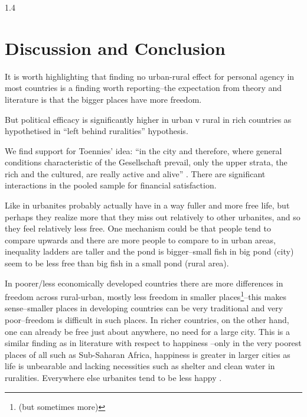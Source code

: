 \documentclass[10pt, letterpaper]{article}
\begin{document}
\begin{spacing}{1.4}
\section{Discussion and Conclusion}


It is worth highlighting that finding no urban-rural effect for personal agency
in most countries is a finding worth reporting--the expectation from theory and
literature is that the bigger places have more freedom. %

But political
  efficacy is significantly higher in urban v rural in rich countries as hypothetised in ``left
  behind ruralities'' hypothesis.

We find support for Toennies' idea:
 ``in the city and therefore, where general conditions characteristic of the
Gesellschaft prevail, only the upper strata, the rich and the cultured, are
really active and alive'' \citep[p. 227]{tonnies57}.
 There are significant interactions in the pooled sample for financial
 satisfaction. 

  
Like in \citet{aok24swls} urbanites probably actually have in a way fuller and
more free life, but perhaps
they realize more that they miss out relatively to other urbanites, and so they
feel relatively less free. One mechanism could be that people tend to compare
upwards \citep{frey02s} and there are more people to compare to in urban areas,
inequality ladders are taller and the pond is bigger--small fish in big pond
(city) seem to be less free than big fish in a small pond (rural area).

In poorer/less economically
developed countries there are more differences in freedom across rural-urban, mostly less freedom in smaller
places\footnote{(but sometimes more)}--this makes sense--smaller places in
developing countries can be very traditional and very poor--freedom is difficult
in such places. In richer countries, on the other hand, one can already be free
just about anywhere, no need for a large city. This is a similar finding as in 
literature with respect to happiness \citep{aokCityBook15}--only in
the very poorest places of all such as Sub-Saharan Africa, happiness is greater in
larger cities as life is unbearable and lacking necessities such as shelter and
clean water in ruralities. Everywhere else urbanites tend to be less happy \citep{aok21}.



\end{spacing}
\end{document}
